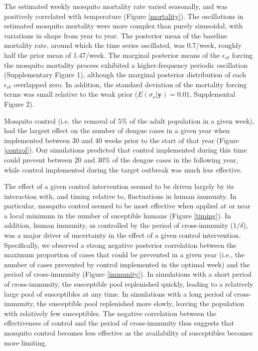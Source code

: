 \documentclass[10pt,letterpaper]{article}
\begin{document}
The estimated weekly mosquito mortality rate varied seasonally, and was positively correlated with temperature (Figure \ref{mortality}).
The oscillations in estimated mosquito mortality were more complex than purely sinusoidal, with variations in shape from year to year.
The posterior mean of the baseline mortality rate, around which the time series oscillated, was 0.7/week, roughly half the prior mean of 1.47/week.
The marginal posterior means of the $\epsilon_{\nu t}$ forcing the mosquito mortality process exhibited a higher-frequency periodic oscillation (Supplementary Figure 1), although the marginal posterior distribution of each $\epsilon_{\nu t}$ overlapped zero.
In addition, the standard deviation of the mortality forcing terms was small relative to the weak prior ($E(\sigma_{\nu}|\mathbf{y}) = 0.01$, Supplemental Figure 2).

Mosquito control (i.e. the removal of $5\%$ of the adult population in a given week), had the largest effect on the number of dengue cases in a given year when implemented between 30 and 40 weeks prior to the start of that year (Figure \ref{control}).
Our simulations predicted that control implemented during this time could prevent between $20$ and $30\%$ of the dengue cases in the following year, while control implemented during the target outbreak was much less effective.

The effect of a given control intervention seemed to be driven largely by its interaction with, and timing relative to, fluctuations in human immunity.
In particular, mosquito control seemed to be most effective when applied at or near a local minimum in the number of suceptible humans (Figure \ref{timing}).
In addition, human immunity, as controlled by the period of cross-immunity ($1/\delta$), was a major driver of uncertainty in the effect of a given control intervention.
Specifically, we observed a strong negative posterior correlation between the maximum proportion of cases that could be prevented in a given year (i.e., the number of cases prevented by control implemented in the optimal week) and the period of cross-immunity (Figure \ref{immunity}). 
In simulations with a short period of cross-immunity, the susceptible pool replenished quickly, leading to a relatively large pool of susceptibles at any time.
In simulations with a long period of cross-immunity, the susceptible pool replenished more slowly, leaving the population with relatively few susceptibles.
The negative correlation between the effectiveness of control and the period of cross-immunity thus suggests that mosquito control becomes less effective as the availability of susceptibles  becomes more limiting.
\end{document}
